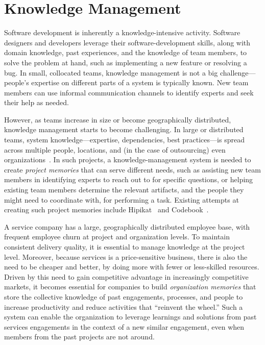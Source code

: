 
\section{Knowledge Management}
\label{sec:km}

Software development is inherently a knowledge-intensive activity. Software
designers and developers leverage their software-development skills, along with
domain knowledge, past experiences, and the knowledge of team members, to solve
the problem at hand, such as implementing a new feature or resolving a bug.  In
small, collocated teams, knowledge management is not a big challenge---people's
expertise on different parts of a system is typically known. New team members
can use informal communication channels to identify experts and seek their help
as needed.

However, as teams increase in size or become geographically distributed,
knowledge management starts to become challenging. In large or distributed
teams, system knowledge---\eg expertise, dependencies, best practices---is
spread across multiple people, locations, and (in the case of outsourcing) even
organizations~\cite{Desouza:2006}. In such projects, a knowledge-management
system is needed to create \textit{project memories} that can serve different
needs, such as assisting new team members in identifying experts to reach out to
for specific questions, or helping existing team members determine the relevant
artifacts, and the people they might need to coordinate with, for performing a
task. Existing attempts at creating such project memories include
Hipikat~\cite{Murphy:2005} and Codebook~\cite{Begel:2010}.


A service company has a large, geographically distributed employee base, with
frequent employee churn at project and organization levels. To maintain
consistent delivery quality, it is essential to manage knowledge at the project
level. Moreover, because services is a price-sensitive business, there is also
the need to be cheaper and better, by doing more with fewer or less-skilled
resources. Driven by this need to gain competitive advantage in increasingly
competitive markets, it becomes essential for companies to build
\textit{organization memories} that store the collective knowledge of past
engagements, processes, and people to increase productivity and reduce
activities that ``reinvent the wheel.'' Such a system can enable the
organization to leverage learnings and solutions from past services engagements in
the context of a new similar engagement, even when members from the past
projects are not around.

